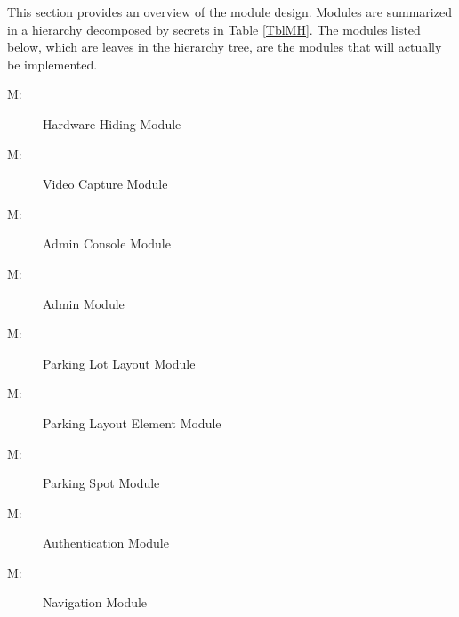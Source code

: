 \documentclass[12pt, titlepage]{article}
\newcounter{mnum}
\newcommand{\mthemnum}{M\themnum}
\begin{document}
This section provides an overview of the module design. Modules are summarized
in a hierarchy decomposed by secrets in Table \ref{TblMH}. The modules listed
below, which are leaves in the hierarchy tree, are the modules that will
actually be implemented.

\begin{description}
\item [ \mthemnum \label{mHH}:] Hardware-Hiding Module
\end{description}

\begin{description}
\item [ \mthemnum \label{mCameraCapture}:] Video Capture
Module
\end{description}

\begin{description}
\item [ \mthemnum \label{mAdminConsole}:] Admin Console
Module
\end{description}

\begin{description}
\item [ \mthemnum \label{mAdmin}:] Admin Module
\end{description}

\begin{description}
\item [ \mthemnum \label{mParkingLotLayout}:] Parking Lot
Layout Module
\end{description}

\begin{description}
\item [ \mthemnum \label{mParkingLayoutElem}:] Parking
Layout Element Module
\end{description}

\begin{description}
\item [ \mthemnum \label{mParkingSpot}:] Parking Spot
Module
\end{description}

\begin{description}
\item [ \mthemnum \label{mAuthentication}:] Authentication
Module
\end{description}

\begin{description}
\item [ \mthemnum \label{mNavigation}:] Navigation Module
\end{description}
\end{document}
